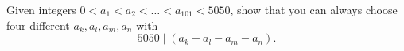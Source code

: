 Given integers $0<a_{1}<a_{2}< \ldots <a_{101}<5050$,
show that you can always choose four different $a_k, a_l, a_m, a_n$ with
$$5050 \mid (a_k+a_l-a_m-a_n).$$